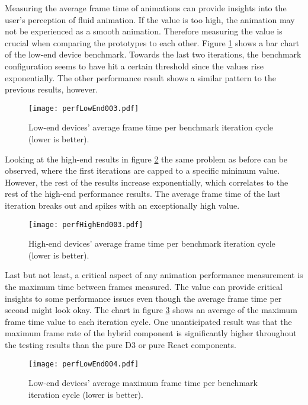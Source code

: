 
Measuring the average frame time of animations can provide insights into the user's perception of fluid animation. If the value is too high, the animation may not be experienced as a smooth animation. Therefore measuring the value is crucial when comparing the prototypes to each other. Figure \ref{fig:perfLowEnd003} shows a bar chart of the low-end device benchmark. Towards the last two iterations, the benchmark configuration seems to have hit a certain threshold since the values rise exponentially. The other performance result shows a similar pattern to the previous results, however.

\begin{figure}
\centering
\texttt{[image: perfLowEnd003.pdf]}
\caption{Low-end devices' average frame time per benchmark iteration cycle (lower is better).}
\label{fig:perfLowEnd003}
\end{figure}

Looking at the high-end results in figure \ref{fig:perfHighEnd003} the same problem as before can be observed, where the first iterations are capped to a specific minimum value. However, the rest of the results increase exponentially, which correlates to the rest of the high-end performance results. The average frame time of the last iteration breaks out and spikes with an exceptionally high value.

\begin{figure}
\centering
\texttt{[image: perfHighEnd003.pdf]}
\caption{High-end devices' average frame time per benchmark iteration cycle (lower is better).}
\label{fig:perfHighEnd003}
\end{figure}

Last but not least, a critical aspect of any animation performance measurement is the maximum time between frames measured. The value can provide critical insights to some performance issues even though the average frame time per second might look okay. The chart in figure \ref{fig:perfLowEnd004} shows an average of the maximum frame time value to each iteration cycle. One unanticipated result was that the maximum frame rate of the hybrid component is significantly higher throughout the testing results than the pure D3 or pure React components.

\begin{figure}
\centering
\texttt{[image: perfLowEnd004.pdf]}
\caption{Low-end devices' average maximum frame time per benchmark iteration cycle (lower is better).}
\label{fig:perfLowEnd004}
\end{figure}

